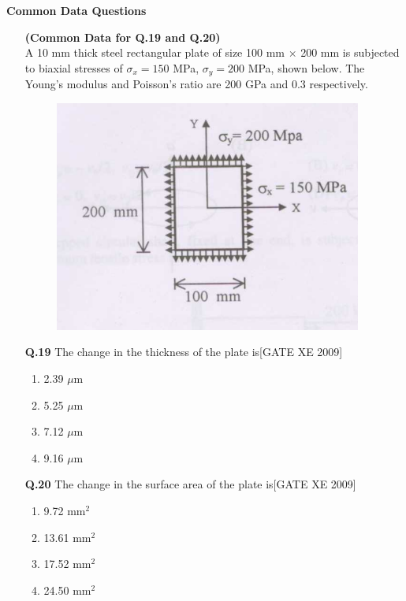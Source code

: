 \documentclass[journal,12pt,onecolumn]{IEEEtran}
\theoremstyle{remark}
\begin{document}
\begin{enumerate}
\begin{enumerate}
 

\Large\textbf{Common Data Questions}
 \begin{enumerate}
\setcounter{enumi}{18} 

\item[] \textbf{(Common Data for Q.19 and Q.20)}  \\
A 10 mm thick steel rectangular plate of size 100 mm $\times$ 200 mm is subjected to biaxial stresses of $\sigma_x = 150$ MPa, $\sigma_y = 200$ MPa, shown below. The Young's modulus and Poisson's ratio are 200 GPa and 0.3 respectively.
\begin{figure}[h]
    \centering
    \includegraphics[width=0.5\columnwidth]{figs/fig24.png}
    
\end{figure}
\end{enumerate}

\begin{enumerate}
    \item [\textbf{Q.19}] The change in the thickness of the plate is\hfill[GATE XE 2009]
\begin{multicols}{2}
\begin{enumerate}
    \item 2.39 $\mu$m
    \item 5.25 $\mu$m
    \item 7.12 $\mu$m
    \item 9.16 $\mu$m

\end{enumerate}
\end{multicols}

\item[\textbf{Q.20}] The change in the surface area of the plate is\hfill[GATE XE 2009]
\begin{multicols}{2}
\begin{enumerate}
    \item 9.72 mm$^2$
    \item 13.61 mm$^2$
    \item 17.52 mm$^2$
    \item 24.50 mm$^2$
\end{enumerate}
\end{multicols}


\end{enumerate}
\end{enumerate}
\end{enumerate}
\end{document}
